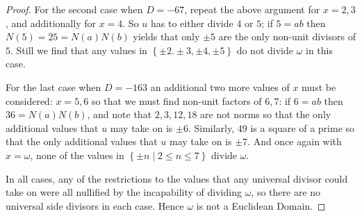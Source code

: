 \documentclass[11pt]{article}
\newcommand{\cbr}[1]{\left\{#1\right\}}
\begin{document}
\begin{enumerate}
\begin{enumerate}[label=(\alph*)]
\begin{proof}
          For the second case when $D = -67$, repeat the above argument for $x = 2,3$, and additionally for $x = 4$. So $u$ has to either divide $4$ or $5$; if $5 = ab$ then $N(5) = 25 = N(a)N(b)$ yields that only $\pm 5$ are the only non-unit divisors of $5$. Still we find that any values in $\cbr{\pm 2. \pm 3, \pm 4, \pm 5}$ do not divide $\omega$ in this case.
          
          For the last case when $D = -163$ an additional two more values of $x$ must be considered: $x = 5,6$ so that we must find non-unit factors of $6,7$: if $6 = ab$ then $36 = N(a)N(b)$, and note that $2,3,12,18$ are not norms so that the only additional values that $u$ may take on is $\pm 6$. Similarly, $49$ is a square of a prime so that the only additional values that $u$ may take on is $\pm 7$. And once again with $x = \omega$, none of the values in $\cbr{\pm n \mid 2\leq n \leq 7}$ divide $\omega$.

          In all cases, any of the restrictions to the values that any universal divisor could take on were all nullified by the incapability of dividing $\omega$, so there are no universal side divisors in each case. Hence $\omega$ is not a Euclidean Domain.
        \end{proof}
    \end{enumerate}
\end{enumerate}
\end{document}
